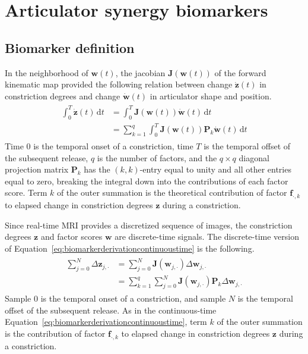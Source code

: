 \documentclass[preprint]{JASAnew}\usepackage[]{graphicx}\usepackage[]{color}
\begin{document}
\section{Articulator synergy biomarkers}
\label{sec:articulator synergy biomarker}

\subsection{Biomarker definition}

In the neighborhood of $\mathbf{w}(t)$, the jacobian $\mathbf{J}(\mathbf{w}(t))$ of the forward kinematic map provided the following relation between change $\mathbf{\dot{z}}(t)$ in constriction degrees and change $\mathbf{\dot{w}}(t)$ in articulator shape and position.
%
\begin{align}
\label{eq:biomarkerderivationcontinuoustime}
\begin{split}
\int_{0}^{T} \mathbf{\dot{z}}(t) \, \mathrm{d}t
	&= \int_{0}^{T} \mathbf{J}\left( \mathbf{w}(t) \right) \mathbf{\dot{w}}(t) \, \mathrm{d}t \\
    &= \sum_{k=1}^q \int_{0}^{T} \mathbf{J}\left( \mathbf{w}(t) \right) \mathbf{P}_k \mathbf{\dot{w}}(t) \, \mathrm{d}t
\end{split}
\end{align}
%
Time $0$ is the temporal onset of a constriction, time $T$ is the temporal offset of the subsequent release, $q$ is the number of factors, and the $q\times q$ diagonal projection matrix $\mathbf{P}_k$ has the $(k,k)$-entry equal to unity and all other entries equal to zero, breaking the integral down into the contributions of each factor score.
Term $k$ of the outer summation is the theoretical contribution of factor $\mathbf{f}_{\cdot,k}$ to elapsed change in constriction degrees $\mathbf{z}$ during a constriction. 

Since real-time MRI provides a discretized sequence of images, the constriction degrees $\mathbf{z}$ and factor scores $\mathbf{w}$ are discrete-time signals. 
%
The discrete-time version of Equation~\ref{eq:biomarkerderivationcontinuoustime} is the following.
%
\begin{align}
\begin{split}
\sum_{j=0}^{N} \Delta \mathbf{z}_{j,\cdot}
	&= \sum_{j=0}^{N} \mathbf{J}\left( \mathbf{w}_{j,\cdot} \right) \Delta \mathbf{w}_{j,\cdot} \\
    &= \sum_{k=1}^q \sum_{j=0}^{N} \mathbf{J}\left( \mathbf{w}_{j,\cdot} \right) \mathbf{P}_k \Delta \mathbf{w}_{j,\cdot}
\end{split}
\end{align}
%
Sample $0$ is the temporal onset of a constriction, and sample $N$ is the temporal offset of the subsequent release.
%
As in the continuous-time Equation~\ref{eq:biomarkerderivationcontinuoustime}, term $k$ of the outer summation is the contribution of factor $\mathbf{f}_{\cdot,k}$ to elapsed change in constriction degrees $\mathbf{z}$ during a constriction.
\end{document}

